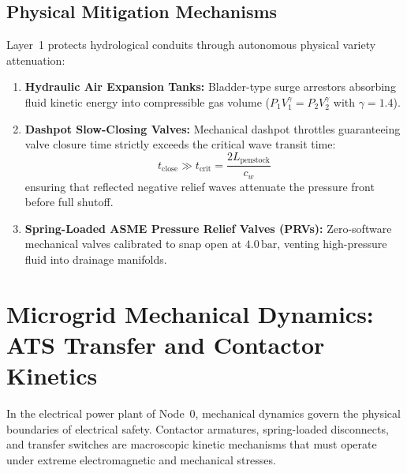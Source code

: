 \subsection{Physical Mitigation Mechanisms}
Layer~1 protects hydrological conduits through autonomous physical variety attenuation:
\begin{enumerate}
    \item \textbf{Hydraulic Air Expansion Tanks:} Bladder-type surge arrestors absorbing fluid kinetic energy into compressible gas volume ($P_1 V_1^{\gamma} = P_2 V_2^{\gamma}$ with $\gamma = 1.4$).
    \item \textbf{Dashpot Slow-Closing Valves:} Mechanical dashpot throttles guaranteeing valve closure time strictly exceeds the critical wave transit time:
    \begin{equation}
    t_{\mathrm{close}} \gg t_{\mathrm{crit}} = \frac{2 L_{\mathrm{penstock}}}{c_w}
    \label{eq:critical_closure_time}
    \end{equation}
    ensuring that reflected negative relief waves attenuate the pressure front before full shutoff.
    \item \textbf{Spring-Loaded ASME Pressure Relief Valves (PRVs):} Zero-software mechanical valves calibrated to snap open at $4.0\,\mathrm{bar}$, venting high-pressure fluid into drainage manifolds.
\end{enumerate}

\section{Microgrid Mechanical Dynamics: ATS Transfer and Contactor Kinetics}
\label{sec:mech_microgrid}

In the electrical power plant of Node~0, mechanical dynamics govern the physical boundaries of electrical safety. Contactor armatures, spring-loaded disconnects, and transfer switches are macroscopic kinetic mechanisms that must operate under extreme electromagnetic and mechanical stresses.

